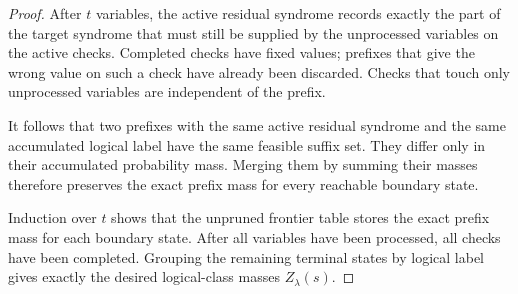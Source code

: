 \documentclass[10pt,a4paper]{amsart}
\begin{document}
\begin{proof}
After \(t\) variables, the active residual syndrome records exactly the part of
the target syndrome that must still be supplied by the unprocessed variables on
the active checks. Completed checks have fixed values; prefixes that give the
wrong value on such a check have already been discarded. Checks that touch only
unprocessed variables are independent of the prefix.

It follows that two prefixes with the same active residual syndrome and the
same accumulated logical label have the same feasible suffix set. They differ
only in their accumulated probability mass. Merging them by summing their
masses therefore preserves the exact prefix mass for every reachable boundary
state.

Induction over \(t\) shows that the unpruned frontier table stores the exact
prefix mass for each boundary state. After all variables have been processed,
all checks have been completed. Grouping the remaining terminal states by
logical label gives exactly the desired logical-class masses \(Z_\lambda(s)\).
\end{proof}
\end{document}
